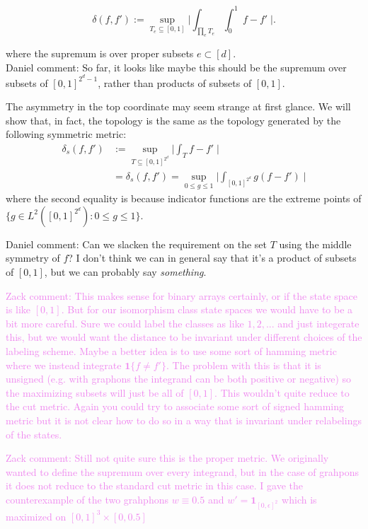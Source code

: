 \documentclass[11pt,oneside,reqno]{article}
\theoremstyle{plain}
\theoremstyle{definition}
\numberwithin{equation}{section}
\renewcommand{\leq}{\leqslant}
\newcommand{\ind}{\mathbf{1}}
\newcommand{\zack}[1]{\textcolor{Violet}{Zack comment: #1}}
\newcommand{\daniel}[1]{\textcolor{Emerald}{Daniel comment: #1}}
\begin{document}
\[\delta(f,f') := \sup_{T_{e} \subseteq [0,1]} \bigg | \int_{\prod_e T_e} \int_0^1 \;f - f' \; \bigg|.\]

\noindent where the supremum is over  proper subsets $e \subset [d]$. \\

\daniel{So far, it looks like maybe this should be the supremum over subsets of $[0,1]^{2^d-1}$, rather than products of subsets of $[0,1]$.}

The asymmetry in the top coordinate may seem strange at first glance. We will show that, in fact, the topology is the same as the topology generated by the following symmetric metric:
\begin{align*}
\delta_s(f,f') &:= \sup_{T \subseteq [0,1]^{2^d}} \bigg | \int_T f - f' \; \bigg| \\
&= \delta_s(f,f') = \sup_{0 \leq g \leq 1} \bigg | \int_{[0,1]^{2^d}} g(f - f') \; \bigg|
\end{align*}
where the second equality is because indicator functions are the extreme points of $\{ g \in L^2([0,1]^{2^d}) : 0 \leq g \leq 1\}$.

\daniel{Can we slacken the requirement on the set $T$ using the middle symmetry of $f$? I don't think we can in general say that it's a product of subsets of $[0,1]$, but we can probably say \emph{something}.}


\zack{This makes sense for binary arrays certainly, or if the state space is like $[0,1]$. But for our isomorphism class state spaces we would have to be a bit more careful. Sure we could label the classes as like $1,2,...$ and just integerate this, but we would want the distance to be invariant under different choices of the labeling scheme. Maybe a better idea is to use some sort of hamming metric where we instead integrate $\ind \{f \neq f'\}$. The problem with this is that it is unsigned (e.g. with graphons the integrand can be both positive or negative) so the maximizing subsets will just be all of $[0,1]$. This wouldn't quite reduce to the cut metric. Again you could try to associate some sort of signed hamming metric but it is not clear how to do so in a way that is invariant under relabelings of the states.}

\zack{Still not quite sure this is the proper metric. We originally wanted to define the supremum over every integrand, but in the case of grahpons it does not reduce to the standard cut metric in this case. I gave the counterexample of the two grahphons $w \equiv 0.5$ and $w' = \ind_{[0, \epsilon]^2}$ which is maximized on $[0,1]^3 \times [0,0.5]$}
\end{document}
